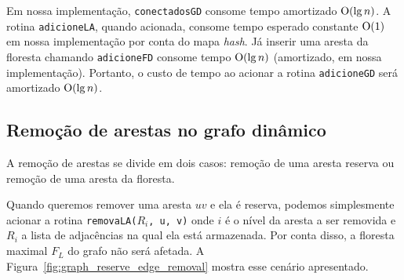 Em nossa implementação, \texttt{conectadosGD} consome tempo amortizado $\mathrm{O}(\lg n)$. A rotina \texttt{adicioneLA}, quando acionada, consome tempo esperado constante $\mathrm{O}(1)$ em nossa implementação por conta do mapa \textit{hash}. Já inserir uma aresta da floresta chamando \texttt{adicioneFD} consome tempo $\mathrm{O}(\lg n)$ (amortizado, em nossa implementação). Portanto, o custo de tempo ao acionar a rotina \texttt{adicioneGD} será amortizado $\mathrm{O}(\lg n)$.























































\subsection{Remoção de arestas no grafo dinâmico}
\label{sec:dynamic-graph-edge-removal}

A remoção de arestas se divide em dois casos: remoção de uma aresta reserva ou remoção de uma aresta da floresta.

Quando queremos remover uma aresta $uv$ e ela é reserva, podemos simplesmente acionar a rotina \texttt{removaLA($R_i$, u, v)} onde $i$ é o nível da aresta a ser removida e $R_i$ a lista de adjacências na qual ela está armazenada. Por conta disso, a floresta maximal $F_L$ do grafo não será afetada. A Figura~\ref{fig:graph_reserve_edge_removal} mostra esse cenário apresentado.

